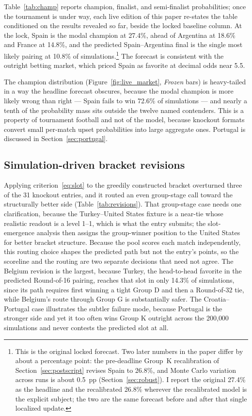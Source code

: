 \documentclass[11pt,letterpaper]{article}
\begin{document}
Table~\ref{tab:champ} reports champion, finalist, and semi-finalist probabilities; once the tournament is under way, each live edition of this paper re-states the table conditioned on the results revealed so far, beside the locked baseline column. At the lock, Spain is the modal champion at 27.4\%, ahead of Argentina at 18.6\% and France at 14.8\%, and the predicted Spain--Argentina final is the single most likely pairing at 10.8\% of simulations.\footnote{This is the original locked forecast. Two later numbers in the paper differ by about a percentage point: the pre-deadline Group~K recalibration of Section~\ref{sec:postscript} revises Spain to 26.8\%, and Monte Carlo variation across runs is about 0.5~pp (Section~\ref{sec:robust}). I report the original 27.4\% as the headline and the recalibrated 26.8\% wherever the recalibrated model is the explicit subject; the two are the same forecast before and after that single localized update.} The forecast is consistent with the outright betting market, which priced Spain as favorite at decimal odds near 5.5.



The champion distribution (Figure~\ref{fig:live_market}, \emph{Frozen} bars) is heavy-tailed in a way the headline forecast obscures, because the modal champion is more likely wrong than right --- Spain fails to win 72.6\% of simulations --- and nearly a tenth of the probability mass sits outside the twelve named contenders. This is a property of tournament football and not of the model, because knockout formats convert small per-match upset probabilities into large aggregate ones. Portugal is discussed in Section~\ref{sec:portugal}.

\subsection{Simulation-driven bracket revisions}

Applying criterion~\eqref{eq:slot} to the greedily constructed bracket overturned three of the 31 knockout entries, and it routed an even group-stage call toward the structurally better side (Table~\ref{tab:revisions}). That group-stage case needs one clarification, because the Turkey--United States fixture is a near-tie whose realistic readout is a level 1--1, which is what the entry submits; the slot-emergence analysis then assigns the group-winner position to the United States for better bracket structure. Because the pool scores each match independently, this routing choice shapes the predicted path but not the entry's points, so the scoreline and the routing are two separate decisions that need not agree. The Belgium revision is the largest, because Turkey, the head-to-head favorite in the predicted Round-of-16 pairing, reaches that slot in only 14.3\% of simulations, since its path requires first winning a tight Group D and then a Round-of-32 tie, while Belgium's route through Group G is substantially safer. The Croatia--Portugal case illustrates the subtler failure mode, because Portugal is the stronger side and yet it too often wins Group K outright across the 200{,}000 simulations and never contests the predicted slot at all.
\end{document}
